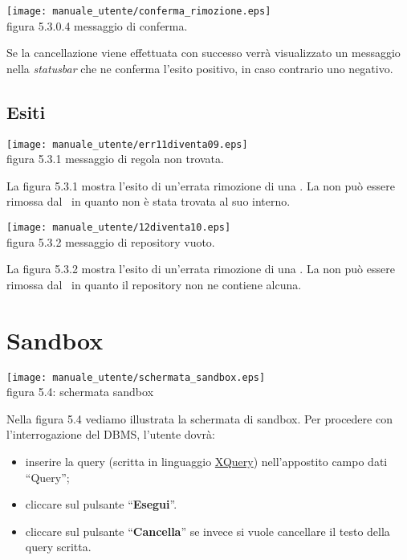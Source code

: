 \begin{center}
\texttt{[image: manuale\_utente/conferma\_rimozione.eps]}\\
 figura 5.3.0.4 messaggio di conferma.
\end{center} 

Se la cancellazione viene effettuata con successo verr\`a visualizzato un messaggio nella \textit{statusbar} che ne conferma l'esito positivo, in caso contrario uno negativo.
\subsection{Esiti}
 
\begin{center}
\texttt{[image: manuale\_utente/err11diventa09.eps]}\\
 figura 5.3.1 messaggio di regola non trovata.
\end{center} 
La figura 5.3.1 mostra l'esito di un'errata rimozione di una \br. La \br non pu\`o essere rimossa dal \rp\ in quanto non \`e stata trovata al suo interno.

\begin{center}
\texttt{[image: manuale\_utente/12diventa10.eps]}\\
 figura 5.3.2 messaggio di repository vuoto.
\end{center} 
La figura 5.3.2 mostra l'esito di un'errata rimozione di una \br. La \br non pu\`o essere rimossa dal \rp\ in quanto il repository non ne contiene alcuna.

\section{Sandbox}
\begin{center}
 \texttt{[image: manuale\_utente/schermata\_sandbox.eps]} \\
 figura 5.4: schermata sandbox
\end{center}
Nella figura 5.4 vediamo illustrata la schermata di sandbox. Per procedere con l'interrogazione del DBMS, l'utente dovr\`a:
\begin{itemize}
\item inserire la query (scritta in linguaggio \underline{XQuery}) nell'appostito campo dati ``Query'';
\item cliccare sul pulsante ``\textbf{Esegui}''.
\item cliccare sul pulsante ``\textbf{Cancella}'' se invece si vuole cancellare il testo della query scritta.
\end{itemize}


